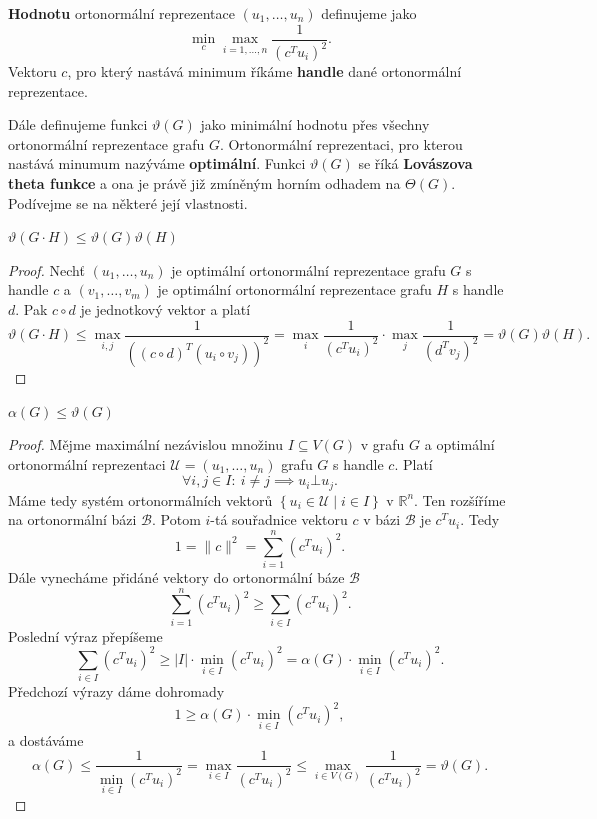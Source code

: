 \noindent \textbf{Hodnotu} ortonormální reprezentace $\left(u_1, \dots, u_n \right)$ definujeme jako
$$
    \min_c \max_{i = 1, \dots, n} \frac{1}{\left( c^T u_i \right)^2}.
$$
Vektoru $c$, pro který nastává minimum říkáme \textbf{handle} dané ortonormální reprezentace.

Dále definujeme funkci $\vartheta(G)$ jako minimální hodnotu přes všechny ortonormální reprezentace grafu $G$. Ortonormální reprezentaci, pro kterou nastává minumum nazýváme \textbf{optimální}. Funkci $\vartheta(G)$ se říká \textbf{Lovászova theta funkce} a ona je právě již zmíněným horním odhadem na $\Theta(G)$. Podívejme se na některé její vlastnosti.

\begin{lm}\cite{lovasz}
    $\vartheta(G \cdot H) \leq \vartheta(G) \vartheta(H)$
\end{lm}

\begin{proof}
    Nechť $\left( u_1, \dots, u_n \right)$ je optimální ortonormální reprezentace grafu $G$ s handle $c$ a $\left( v_1, \dots, v_m \right)$ je optimální ortonormální reprezentace grafu $H$ s handle $d$. Pak $c \circ d$ je jednotkový vektor a platí
    $$
        \vartheta(G \cdot H) \leq \max_{i,j} \frac{1}{\left( \left( c \circ d \right)^T \left( u_i \circ v_j \right) \right)^2} = \max_i \frac{1}{\left( c^T u_i \right)^2} \cdot \max_j \frac{1}{\left( d^T v_j \right)^2} = \vartheta(G)\vartheta(H).
    $$
\end{proof}

\begin{lm}\cite{lovasz}
    $\alpha(G) \leq \vartheta(G)$
\end{lm}

\begin{proof}
    Mějme maximální nezávislou množinu $I \subseteq V(G)$ v grafu $G$ a optimální ortonormální reprezentaci $\mathcal{U} = \left( u_1, \dots, u_n \right)$ grafu $G$ s handle $c$. Platí
    $$
        \forall i,j \in I:\ i \neq j \implies u_i \bot u_j.
    $$
    Máme tedy systém ortonormálních vektorů $\left\{ u_i \in \mathcal{U} \mid i \in I \right\}$ v $\mathbb{R}^n$. Ten rozšíříme na ortonormální bázi $\mathcal{B}$. Potom $i$-tá souřadnice vektoru $c$ v bázi $\mathcal{B}$ je $c^T u_i$. Tedy
    $$
        1 = \| c \|^2 = \sum_{i=1}^n \left( c^T u_i \right)^2.
    $$
    Dále vynecháme přidáné vektory do ortonormální báze $\mathcal{B}$
    $$
        \sum_{i=1}^n \left( c^T u_i \right)^2 \geq \sum_{i \in I} \left( c^T u_i \right)^2.
    $$
    Poslední výraz přepíšeme
    $$
        \sum_{i \in I} \left( c^T u_i \right)^2 \geq |I| \cdot \min_{i \in I}\left( c^T u_i \right)^2 = \alpha(G) \cdot \min_{i \in I}\left( c^T u_i \right)^2.
    $$
    Předchozí výrazy dáme dohromady
    $$
        1 \geq \alpha(G) \cdot \min_{i \in I}\left( c^T u_i \right)^2,
    $$
    a dostáváme
    $$
        \alpha(G) \leq \frac{1}{\min_{i \in I}\left( c^T u_i \right)^2} = \max_{i \in I} \frac{1}{\left( c^T u_i \right)^2} \leq \max_{i \in V(G)} \frac{1}{\left( c^T u_i \right)^2} = \vartheta(G).
    $$
\end{proof}

